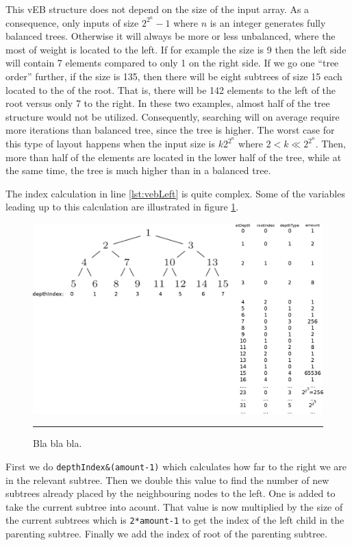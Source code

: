 This vEB structure does not depend on the size of the input array. As a consequence, only inputs of size $2^{2^n}-1$ where $n$ is an integer generates fully balanced trees.
Otherwise it will always be more or less unbalanced, where the most of weight is located to the left. If for example the size is 9 then the left side will contain 7 elements compared to only 1 on the right side.
If we go one ``tree order'' further, if the size is 135, then there will be eight subtrees of size 15 each located to the of the root. That is, there will be 142 elements to the left of the root versus only 7 to the right.
In these two examples, almost half of the tree structure would not be utilized. Consequently, searching will on average require more iterations than balanced tree, since the tree is higher.
The worst case for this type of layout happens when the input size is $k 2^{2^n}$ where $2 < k \ll 2^{2^n}$. Then, more than half of the elements are located in the lower half of the tree, while at the same time, the tree is much higher than in a balanced tree.

The index calculation in line \ref{lst:vebLeft} is quite complex.
Some of the variables leading up to this calculation are illustrated in figure \ref{fig:vEB}.
\begin{figure}[htbp]
	\centering
		\includegraphics[width=\textwidth]{./Figures/Project1/vEB.eps}
		\rule{35em}{0.5pt}
	\caption[Van Emde Boas construction]{
	Bla bla bla.
	}
	\label{fig:vEB}
\end{figure}

First we do \verb!depthIndex&(amount-1)! which calculates how far to the right we are in the relevant subtree.
Then we double this value to find the number of new subtrees already placed by the neighbouring nodes to the left. One is added to take the current subtree into acount.
That value is now multiplied by the size of the current subtrees which is \verb!2*amount-1! to get the index of the left child in the parenting subtree.
Finally we add the index of root of the parenting subtree.


